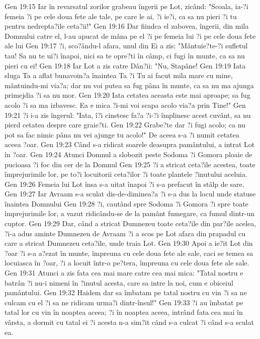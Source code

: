 Gen 19:15  Iar în revarsatul zorilor grabeau îngerii pe Lot, zicând: "Scoala, ia-?i femeia ?i pe cele doua fete ale tale, pe care le ai, ?i ie?i, ca sa nu pieri ?i tu pentru nedrepta?ile ceta?ii!"
Gen 19:16  Dar fiindca el zabovea, îngerii, din mila Domnului catre el, l-au apucat de mâna pe el ?i pe femeia lui ?i pe cele doua fete ale lui
Gen 19:17  ?i, sco?ându-l afara, unul din Ei a zis: "Mântuie?te-?i sufletul tau! Sa nu te ui?i înapoi, nici sa te opre?ti în câmp, ci fugi în munte, ca sa nu pieri cu ei!
Gen 19:18  Iar Lot a zis catre Dân?ii: "Nu, Stapâne!
Gen 19:19  Iata sluga Ta a aflat bunavoin?a înaintea Ta ?i Tu ai facut mila mare cu mine, mântuindu-mi via?a; dar nu voi putea sa fug pâna în munte, ca sa nu ma ajunga primejdia ?i sa nu mor.
Gen 19:20  Iata cetatea aceasta este mai aproape; sa fug acolo ?i sa ma izbavesc. Ea e mica ?i-mi voi scapa acolo via?a prin Tine!"
Gen 19:21  ?i i-a zis îngerul: "Iata, î?i cinstesc fa?a ?i-?i împlinesc acest cuvânt, sa nu pierd cetatea despre care graie?ti.
Gen 19:22  Grabe?te dar ?i fugi acolo; ca nu pot sa fac nimic pâna nu vei ajunge tu acolo!" De aceea s-a ?i numit cetatea aceea ?oar.
Gen 19:23  Când s-a ridicat soarele deasupra pamântului, a intrat Lot în ?oar.
Gen 19:24  Atunci Domnul a slobozit peste Sodoma ?i Gomora ploaie de pucioasa ?i foc din cer de la Domnul
Gen 19:25  ?i a stricat ceta?ile acestea, toate împrejurimile lor, pe to?i locuitorii ceta?ilor ?i toate plantele ?inutului aceluia.
Gen 19:26  Femeia lui Lot însa s-a uitat înapoi ?i s-a prefacut în stâlp de sare.
Gen 19:27  Iar Avraam s-a sculat dis-de-diminea?a ?i s-a dus la locul unde statuse înaintea Domnului
Gen 19:28  ?i, cautând spre Sodoma ?i Gomora ?i spre toate împrejurimile lor, a vazut ridicându-se de la pamânt fumegare, ca fumul dintr-un cuptor.
Gen 19:29  Dar, când a stricat Dumnezeu toate ceta?ile din par?ile acelea, ?i-a adus aminte Dumnezeu de Avraam ?i a scos pe Lot afara din prapadul cu care a stricat Dumnezeu ceta?ile, unde traia Lot.
Gen 19:30  Apoi a ie?it Lot din ?oar ?i s-a a?ezat în munte, împreuna cu cele doua fete ale sale, caci se temea sa locuiasca în ?oar, ?i a locuit într-o pe?tera, împreuna cu cele doua fete ale sale.
Gen 19:31  Atunci a zis fata cea mai mare catre cea mai mica: "Tatal nostru e batrân ?i nu-i nimeni în ?inutul acesta, care sa intre la noi, cum e obiceiul pamântului.
Gen 19:32  Haidem dar sa îmbatam pe tatal nostru cu vin ?i sa ne culcam cu el ?i sa ne ridicam urma?i dintr-însul!"
Gen 19:33  ?i au îmbatat pe tatal lor cu vin în noaptea aceea; ?i în noaptea aceea, intrând fata cea mai în vârsta, a dormit cu tatal ei ?i acesta n-a sim?it când s-a culcat ?i când s-a sculat ea.
